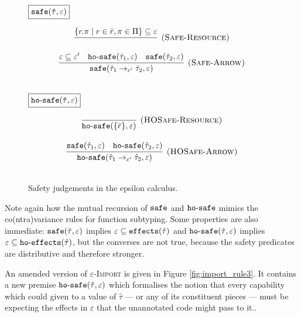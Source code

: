 \begin{figure}[h]

\noindent
$\fbox{$\mathtt{safe(\hat \tau, \varepsilon)}$}$

\[
\begin{array}{c}

\infer[\textsc{(Safe-Resource)}]
	{}
	{ \{ r.\pi \mid r \in \bar r, \pi \in \Pi \} \subseteq \varepsilon } \\[3ex]

\infer[\textsc{(Safe-Arrow)}]
	{\kwa{safe}(\hat \tau_1 \rightarrow_{\varepsilon'} \hat \tau_2, \varepsilon)}
	{\varepsilon \subseteq \varepsilon' & \kwa{ho \hyphen safe}(\hat \tau_1, \varepsilon) & \kwa{safe}(\hat \tau_2, \varepsilon)} \\[3ex]

\end{array}
\]

\noindent
$\fbox{$\mathtt{ho \hbox{-} safe(\hat \tau, \varepsilon)}$}$

\[
\begin{array}{c}

\infer[\textsc{(HOSafe-Resource)}]
	{ \kwa{ho \hyphen safe}( \{ \bar r \}, \varepsilon)} 
	{} \\[3ex]

\infer[\textsc{(HOSafe-Arrow)}]
	{ \kwa{ho \hyphen safe}( \hat \tau_1 \rightarrow_{\varepsilon'} \hat \tau_2, \varepsilon ) }
	{ \kwa{safe}(\hat \tau_1, \varepsilon)  & \kwa{ho \hyphen safe}(\hat \tau_2, \varepsilon) }\\[3ex]

\end{array}
\]

\vspace{-7pt}
\caption{Safety judgements in the epsilon calculus.}
\label{fig:safe_defns}
\end{figure}

Note again how the mutual recursion of $\mathtt{safe}$ and $\mathtt{ho \hbox{-} safe}$ mimics the co(ntra)variance rules for function subtyping. Some properties are also immediate: $\mathtt{safe}(\hat \tau, \varepsilon)$ implies $\varepsilon \subseteq \mathtt{effects}(\hat \tau)$ and $\mathtt{ho \hbox{-} safe}(\hat \tau, \varepsilon)$ implies $\varepsilon \subseteq \mathtt{ho \hbox{-} effects}(\hat \tau)$, but the converses are not true, because the safety predicates are distributive and therefore stronger.

An amended version of \textsc{$\varepsilon$-Import} is given in Figure \ref{fig:import_rule3}. It contains a new premise $\mathtt{ho \hbox{-} safe}(\hat \tau, \varepsilon)$ which formalises the notion that every capability which could given to a value of $\hat \tau$ --- or any of its constituent pieces --- must be expecting the effects in $\varepsilon$ that the unannotated code might pass to it..

